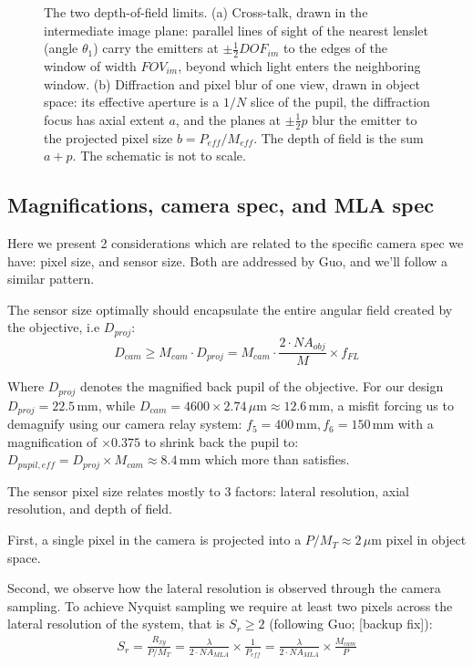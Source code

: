 \begin{figure}[tbp]
    \centering
    \resizebox{\textwidth}{!}{}
    \caption{The two depth-of-field limits. (a) Cross-talk, drawn in the intermediate image plane: parallel lines of sight of the nearest lenslet (angle $\theta_1$) carry the emitters at $\pm\frac{1}{2}DOF_{im}$ to the edges of the window of width $FOV_{im}$, beyond which light enters the neighboring window. (b) Diffraction and pixel blur of one view, drawn in object space: its effective aperture is a $1/N$ slice of the pupil, the diffraction focus has axial extent $a$, and the planes at $\pm\frac{1}{2}p$ blur the emitter to the projected pixel size $b=P_{eff}/M_{eff}$. The depth of field is the sum $a+p$. The schematic is not to scale.}
    \label{bk:fig:dof-geometry}
\end{figure}

\subsection{Magnifications, camera spec, and MLA spec}
\label{bk:subsec:magnification-camera-spec}
Here we present 2 considerations which are related to the specific camera spec we have: pixel size, and sensor size. Both are addressed by Guo, and we'll follow a similar pattern.

The sensor size optimally should encapsulate the entire angular field created by the objective, i.e $D_{proj}$:
\begin{equation}
    D_{cam} \ge M_{cam}\cdot D_{proj} = M_{cam}\cdot \frac{2\cdot NA_{obj}}{M}\times f_{FL}
\end{equation}

Where $D_{proj}$ denotes the magnified back pupil of the objective. For our design $D_{proj}=22.5\,\mathrm{mm}$, while $D_{cam}=4600\times 2.74 \,\mu\mathrm{m}\approx 12.6\,\mathrm{mm}$, a misfit forcing us to demagnify using our camera relay system: $f_5=400\,\mathrm{mm},f_6=150\,\mathrm{mm}$ with a magnification of $\times 0.375$ to shrink back the pupil to: $D_{pupil,eff}=D_{proj}\times M_{cam}\approx 8.4\,\mathrm{mm}$ which more than satisfies.

The sensor pixel size relates mostly to 3 factors: lateral resolution, axial resolution, and depth of field.

First, a single pixel in the camera is projected into a $P/M_T\approx 2 \,\mu\mathrm{m}$ pixel in object space.

Second, we observe how the lateral resolution is observed through the camera sampling. To achieve Nyquist sampling we require at least two pixels across the lateral resolution of the system, that is $S_r\ge 2$ (following Guo; [backup fix]):
\begin{gather}
    S_r = \frac{R_{xy}}{P/M_{T}} = \frac{\lambda}{2\cdot NA_{MLA}}\times \frac{1}{P_{eff}} = \frac{\lambda}{2\cdot NA_{MLA}}\times \frac{M_{cam}}{P}
\end{gather}

